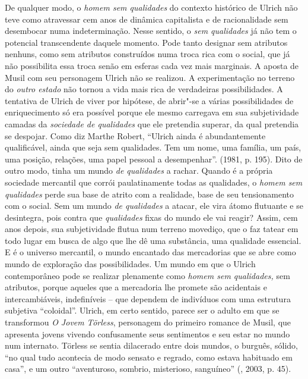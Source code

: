 {De qualquer modo, o \emph{homem sem qualidades} do contexto histórico de
Ulrich não teve como atravessar cem anos de dinâmica capitalista e de
racionalidade sem desembocar numa indeterminação. Nesse sentido, o
\emph{sem qualidades} já não tem o potencial transcendente daquele
momento. Pode tanto designar sem atributos nenhuns, como sem atributos
construídos numa troca rica com o social, que já não possibilita essa
troca senão em esferas cada vez mais marginais. A aposta de Musil com
seu personagem Ulrich não se realizou. A experimentação no terreno do
\emph{outro estado} não tornou a vida mais rica de verdadeiras
possibilidades. A tentativa de Ulrich de viver por hipótese, de abrir"-se
a várias possibilidades de enriquecimento só era possível porque ele
mesmo carregava em sua subjetividade camadas da \emph{sociedade de
qualidades} que ele pretendia superar, da qual pretendia se despojar.
Como diz Marthe Robert, ``Ulrich ainda é abundantemente qualificável,
ainda que seja sem qualidades. Tem um nome, uma família, um país, uma
posição, relações, uma papel pessoal a desempenhar''. (1981, p. 195).
Dito de outro modo, tinha um mundo \emph{de qualidades} a rachar. Quando
é a própria sociedade mercantil que corrói paulatinamente todas as
qualidades, o \emph{homem sem qualidades} perde sua base de atrito com a
realidade, base de seu tensionamento com o social. Sem um mundo \emph{de
qualidades} a atacar, ele vira átomo flutuante e se desintegra, pois
contra que \emph{qualidades} fixas do mundo ele vai reagir? Assim, cem
anos depois, sua subjetividade flutua num terreno movediço, que o faz
tatear em todo lugar em busca de algo que lhe dê uma substância, uma
qualidade essencial. E é o universo mercantil, o mundo encantado das
mercadorias que se abre como mundo de exploração das possibilidades. Um
mundo em que o Ulrich contemporâneo pode se realizar plenamente como
\emph{homem sem qualidades,} sem atributos, porque aqueles que a
mercadoria lhe promete são acidentais e intercambiáveis, indefiníveis
-- que dependem de indivíduos com uma estrutura subjetiva ``coloidal''.
Ulrich, em certo sentido, parece ser o adulto em que se transformou
\emph{O Jovem} \emph{Törless}, personagem do primeiro romance de Musil,
que apresenta jovens vivendo confusamente seus sentimentos e seu estar
no mundo num internato. Törless se sentia dilacerado entre dois mundos,
o burguês, sólido, ``no qual tudo acontecia de modo sensato e regrado,
como estava habituado em casa'', e um outro ``aventuroso, sombrio,
misterioso, sanguíneo'' (, 2003, p. 45).

}
